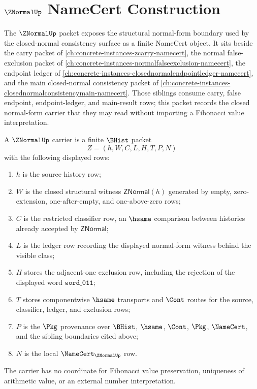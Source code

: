 \chapter{$\ZNormalUp$ NameCert Construction}
\label{ch:concrete-instances-znormal-namecert}

The $\ZNormalUp$ packet exposes the structural normal-form boundary used by the closed-normal consistency surface as a finite NameCert object. It sits beside the carry packet of \autoref{ch:concrete-instances-zcarry-namecert}, the normal false-exclusion packet of \autoref{ch:concrete-instances-normalfalseexclusion-namecert}, the endpoint ledger of \autoref{ch:concrete-instances-closednormalendpointledger-namecert}, and the main closed-normal consistency packet of \autoref{ch:concrete-instances-closednormalconsistencymain-namecert}. Those siblings consume carry, false endpoint, endpoint-ledger, and main-result rows; this packet records the closed normal-form carrier that they may read without importing a Fibonacci value interpretation.

\begin{definition}
\label{def:z-normal-carrier}
A $\ZNormalUp$ carrier is a finite $\BHist$ packet
$$
Z=(h,W,C,L,H,T,P,N)
$$
with the following displayed rows:
\begin{enumerate}
\item $h$ is the source history row;
\item $W$ is the closed structural witness $\mathsf{ZNormal}(h)$ generated by empty, zero-extension, one-after-empty, and one-above-zero rows;
\item $C$ is the restricted classifier row, an $\hsame$ comparison between histories already accepted by $\mathsf{ZNormal}$;
\item $L$ is the ledger row recording the displayed normal-form witness behind the visible class;
\item $H$ stores the adjacent-one exclusion row, including the rejection of the displayed word $\mathtt{word\_011}$;
\item $T$ stores componentwise $\hsame$ transports and $\Cont$ routes for the source, classifier, ledger, and exclusion rows;
\item $P$ is the $\Pkg$ provenance over $\BHist$, $\hsame$, $\Cont$, $\Pkg$, $\NameCert$, and the sibling boundaries cited above;
\item $N$ is the local $\NameCert_{\ZNormalUp}$ row.
\end{enumerate}
The carrier has no coordinate for Fibonacci value preservation, uniqueness of arithmetic value, or an external number interpretation.
\end{definition}

